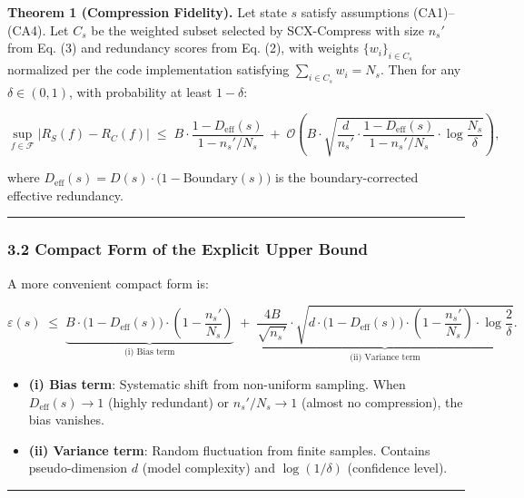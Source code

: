 \documentclass[
  12pt,
]{article}
\providecommand{\tightlist}{%
  \setlength{\itemsep}{0pt}\setlength{\parskip}{0pt}}
\begin{document}
\textbf{Theorem 1 (Compression Fidelity).} Let state \(s\) satisfy assumptions
(CA1)--(CA4). Let \(C_s\) be the weighted subset selected by SCX-Compress with size \(n_s'\) from Eq. (3) and redundancy scores from Eq.
(2), with weights \(\{w_i\}_{i \in C_s}\)
normalized per the code implementation satisfying \(\sum_{i \in C_s} w_i = N_s\). Then for any
\(\delta \in (0, 1)\), with probability at least \(1 - \delta\):

\[
\sup_{f \in \mathcal{F}} \bigl| R_S(f) - R_C(f) \bigr|
\;\leq\; B \cdot \frac{1 - D_{\text{eff}}(s)}{1 - n_s'/N_s}
\;+\; \mathcal{O}\!\left(
B \cdot \sqrt{\frac{d}{n_s'} \cdot \frac{1 - D_{\text{eff}}(s)}{1 - n_s'/N_s} \cdot \log\frac{N_s}{\delta}}
\right),
\tag{6}
\]

where
\(D_{\text{eff}}(s) = D(s) \cdot \bigl(1 - \text{Boundary}(s)\bigr)\)
is the boundary-corrected effective redundancy.

\begin{center}\rule{0.5\linewidth}{0.5pt}\end{center}

\subsubsection{3.2 Compact Form of the Explicit Upper Bound}\label{compact-form}

A more convenient compact form is:

\[
\varepsilon(s) \;\leq\; \underbrace{B \cdot \bigl(1 - D_{\text{eff}}(s)\bigr) \cdot \left(1 - \frac{n_s'}{N_s}\right)}_{\text{(i) Bias term}}
\;+\; \underbrace{\frac{4B}{\sqrt{n_s'}} \cdot \sqrt{d \cdot \bigl(1 - D_{\text{eff}}(s)\bigr) \cdot \left(1 - \frac{n_s'}{N_s}\right) \cdot \log\frac{2}{\delta}}}_{\text{(ii) Variance term}}.
\tag{7}
\]

\begin{itemize}
\tightlist
\item
  \textbf{(i) Bias term}: Systematic shift from non-uniform sampling. When
  \(D_{\text{eff}}(s) \to 1\) (highly redundant) or
  \(n_s'/N_s \to 1\) (almost no compression), the bias vanishes.
\item
  \textbf{(ii) Variance term}: Random fluctuation from finite samples. Contains pseudo-dimension \(d\) (model complexity) and
  \(\log(1/\delta)\) (confidence level).
\end{itemize}

\begin{center}\rule{0.5\linewidth}{0.5pt}\end{center}
\end{document}
